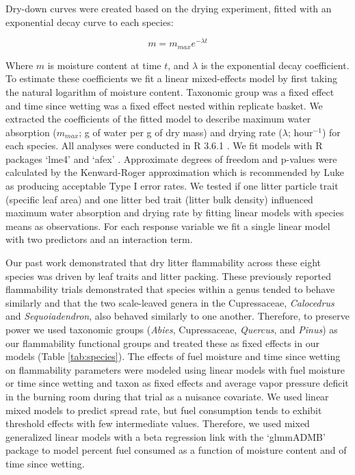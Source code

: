 \documentclass[letterpaper,12pt]{article}
\begin{document}
Dry-down curves were created based on the drying experiment, fitted with an
exponential decay curve to each species:

\begin{equation}
m = m_{max} e^{-\lambda t}
\end{equation}

Where $m$ is moisture content at time $t$, and $\lambda$ is the exponential
decay coefficient. To estimate these coefficients we fit a linear mixed-effects
model by first taking the natural logarithm of moisture content. Taxonomic
group was a fixed effect and time since wetting was a fixed effect nested
within replicate basket. We extracted the coefficients of the fitted model to
describe maximum water absorption ($m_{max}$; g of water per g of dry mass) and
drying rate ($\lambda$; hour$^{-1}$) for each species. All analyses were
conducted in R 3.6.1 \citep{RCoreTeam-2019}. We fit models with R packages
`lme4' \citep{Bates_Machler_etal-2015} and `afex'
\citep{Singmann_Bolker_etal-2017}. Approximate degrees of freedom and p-values
were calculated by the Kenward-Roger approximation \citep{Kenward_Roger-1997}
which is recommended by Luke \citeyear{Luke-2017} as producing acceptable Type
I error rates. We tested if one litter particle trait (specific leaf area) and
one litter bed trait (litter bulk density) influenced maximum water absorption
and drying rate by fitting linear models with species means as observations.
For each response variable we fit a single linear model with two predictors and
an interaction term.

Our past work \citep{Magalhaes+Schwilk-2012} demonstrated that dry litter
flammability across these eight species was driven by leaf traits and litter
packing. These previously reported flammability trials demonstrated that
species within a genus tended to behave similarly and that the two scale-leaved
genera in the Cupressaceae, \emph{Calocedrus} and \emph{Sequoiadendron}, also
behaved similarly to one another. Therefore, to preserve power we used
taxonomic groups (\emph{Abies}, Cupressaceae, \emph{Quercus}, and \emph{Pinus})
as our flammability functional groups and treated these as fixed effects in our
models (Table \ref{tab:species}). The effects of fuel moisture and time since wetting on flammability
parameters were modeled using linear models with fuel moisture or time since
wetting and taxon as fixed effects and average vapor pressure deficit in the
burning room during that trial as a nuisance covariate. We used linear mixed
models to predict spread rate, but fuel consumption tends to exhibit threshold
effects with few intermediate values. Therefore, we used mixed generalized
linear models with a beta regression link with the `glmmADMB' package
\citep{Skaug_Fournier_etal-2016} to model percent fuel consumed as a function
of moisture content and of time since wetting.
\end{document}
